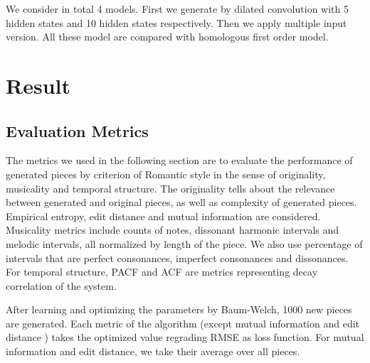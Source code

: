 \documentclass[10pt, oneside]{article}
\begin{document}
We consider in total 4 models. First we generate by dilated convolution with 5 hidden states and 10 hidden states respectively. Then we apply multiple input version. All these model are compared with homologous first order model.

\section{Result}
\subsection{Evaluation Metrics }
The metrics we used in the following section are to evaluate the performance of generated pieces  by criterion of Romantic style in the sense of originality, musicality and temporal structure. The originality tells about the relevance between generated and original pieces, as well as complexity of generated pieces. Empirical entropy, edit distance and mutual information are considered. Musicality metrics include counts of notes, dissonant harmonic intervals and melodic intervals, all normalized by length of the piece. We also use percentage of intervals that are perfect consonances, imperfect consonances and dissonances. For temporal structure, PACF and ACF are metrics representing decay correlation of the system. 

After learning and optimizing the parameters by Baum-Welch, 1000 new pieces are generated. Each metric of the algorithm (except mutual information and edit distance ) takes the optimized value regrading RMSE as loss function. For mutual information and edit distance, we take their average over all pieces.
\end{document}
